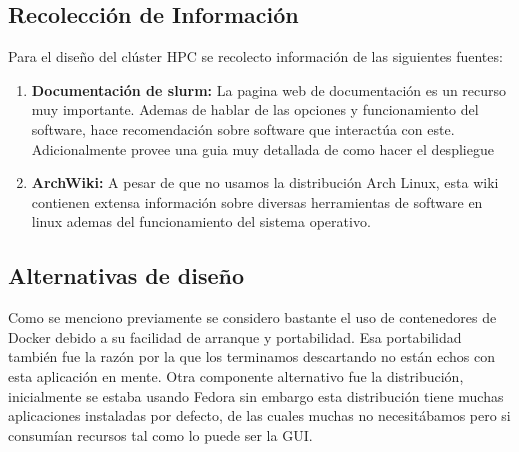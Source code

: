 \subsection{Recolección de Información}
Para el diseño del clúster HPC se recolecto información de las siguientes fuentes:
\begin{enumerate}
    \item  \textbf{Documentación de slurm: }La pagina web de documentación es un recurso muy importante. Ademas de hablar de las opciones y funcionamiento del software, hace recomendación sobre software que interactúa con este. Adicionalmente provee una guia muy detallada de como hacer el despliegue
    \item \textbf{ArchWiki: }A pesar de que no usamos la distribución Arch Linux, esta wiki contienen extensa información sobre diversas herramientas de software en linux ademas del funcionamiento del sistema operativo.
\end{enumerate}

\subsection{Alternativas de diseño}
Como se menciono previamente se considero bastante el uso de contenedores de Docker debido a su facilidad de arranque y portabilidad. Esa portabilidad también fue la razón por la que los terminamos descartando no están echos con esta aplicación en mente. Otra componente alternativo fue la distribución, inicialmente se estaba usando Fedora sin embargo esta distribución tiene muchas aplicaciones instaladas por defecto, de las cuales muchas no necesitábamos pero si consumían recursos tal como lo puede ser la GUI.